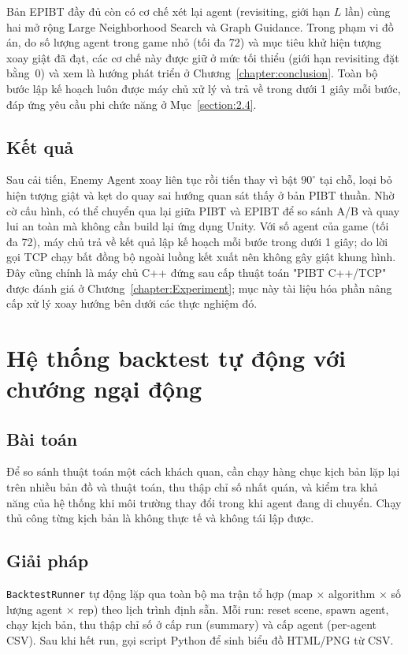 \documentclass[../DoAn.tex]{subfiles}
\begin{document}
Bản EPIBT đầy đủ còn có cơ chế xét lại agent (revisiting, giới hạn $L$ lần) cùng hai
mở rộng Large Neighborhood Search và Graph Guidance. Trong phạm vi đồ án, do số lượng
agent trong game nhỏ (tối đa 72) và mục tiêu khử hiện tượng xoay giật đã đạt, các cơ
chế này được giữ ở mức tối thiểu (giới hạn revisiting đặt bằng~0) và xem là hướng phát
triển ở Chương~\ref{chapter:conclusion}. Toàn bộ bước lập kế hoạch luôn được máy chủ xử
lý và trả về trong dưới 1 giây mỗi bước, đáp ứng yêu cầu phi chức năng ở
Mục~\ref{section:2.4}.

\subsection*{Kết quả}
Sau cải tiến, Enemy Agent xoay liên tục rồi tiến thay vì bật $90^\circ$ tại chỗ, loại bỏ
hiện tượng giật và kẹt do quay sai hướng quan sát thấy ở bản PIBT thuần. Nhờ cờ cấu
hình, có thể chuyển qua lại giữa PIBT và EPIBT để so sánh A/B và quay lui an toàn mà
không cần build lại ứng dụng Unity. Với số agent của game (tối đa 72), máy chủ trả về
kết quả lập kế hoạch mỗi bước trong dưới 1 giây; do lời gọi TCP chạy bất đồng bộ ngoài
luồng kết xuất nên không gây giật khung hình. Đây
cũng chính là máy chủ C++ đứng sau cấp thuật toán "PIBT C++/TCP" được đánh giá ở
Chương~\ref{chapter:Experiment}; mục này tài liệu hóa phần nâng cấp xử lý xoay hướng
bên dưới các thực nghiệm đó.

\section{Hệ thống backtest tự động với chướng ngại động}
\label{section:5.6}

\subsection*{Bài toán}
Để so sánh thuật toán một cách khách quan, cần chạy hàng chục kịch bản lặp lại trên
nhiều bản đồ và thuật toán, thu thập chỉ số nhất quán, và kiểm tra khả năng của hệ
thống khi môi trường thay đổi trong khi agent đang di chuyển. Chạy thủ công từng kịch
bản là không thực tế và không tái lập được.

\subsection*{Giải pháp}
\texttt{BacktestRunner} tự động lặp qua toàn bộ ma trận tổ hợp (map × algorithm ×
số lượng agent × rep) theo lịch trình định sẵn. Mỗi run: reset scene, spawn agent, chạy kịch bản, thu thập chỉ
số ở cấp run (summary) và cấp agent (per-agent CSV). Sau khi hết run, gọi script Python
để sinh biểu đồ HTML/PNG từ CSV.
\end{document}
